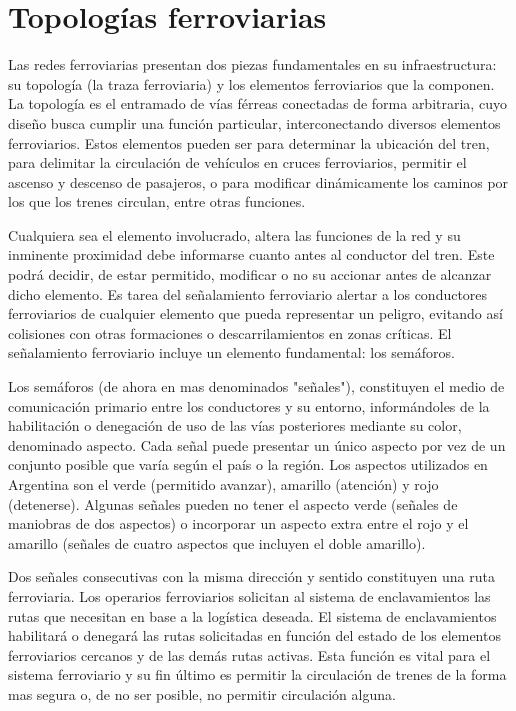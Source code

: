 \section{Topologías ferroviarias}
    \label{sec:topologias}
    Las redes ferroviarias presentan dos piezas fundamentales en su infraestructura: su topología (la traza ferroviaria) y los elementos ferroviarios que la componen. La topología es el entramado de vías férreas conectadas de forma arbitraria, cuyo diseño busca cumplir una función particular, interconectando diversos elementos ferroviarios. Estos elementos pueden ser para determinar la ubicación del tren, para delimitar la circulación de vehículos en cruces ferroviarios, permitir el ascenso y descenso de pasajeros, o para modificar dinámicamente los caminos por los que los trenes circulan, entre otras funciones.

    Cualquiera sea el elemento involucrado, altera las funciones de la red y su inminente proximidad debe informarse cuanto antes al conductor del tren. Este podrá decidir, de estar permitido, modificar o no su accionar antes de alcanzar dicho elemento. Es tarea del señalamiento ferroviario alertar a los conductores ferroviarios de cualquier elemento que pueda representar un peligro, evitando así colisiones con otras formaciones o descarrilamientos en zonas críticas. El señalamiento ferroviario incluye un elemento fundamental: los semáforos.

    Los semáforos (de ahora en mas denominados "señales"), constituyen el medio de comunicación primario entre los conductores y su entorno, informándoles de la habilitación o denegación de uso de las vías posteriores mediante su color, denominado aspecto. Cada señal puede presentar un único aspecto por vez de un conjunto posible que varía según el país o la región. Los aspectos utilizados en Argentina son el verde (permitido avanzar), amarillo (atención) y rojo (detenerse). Algunas señales pueden no tener el aspecto verde (señales de maniobras de dos aspectos) o incorporar un aspecto extra entre el rojo y el amarillo (señales de cuatro aspectos que incluyen el doble amarillo).
    
    Dos señales consecutivas con la misma dirección y sentido constituyen una ruta ferroviaria. Los operarios ferroviarios solicitan al sistema de enclavamientos las rutas que necesitan en base a la logística deseada. El sistema de enclavamientos habilitará o denegará las rutas solicitadas en función del estado de los elementos ferroviarios cercanos y de las demás rutas activas. Esta función es vital para el sistema ferroviario y su fin último es permitir la circulación de trenes de la forma mas segura o, de no ser posible, no permitir circulación alguna.

    
    
    
    